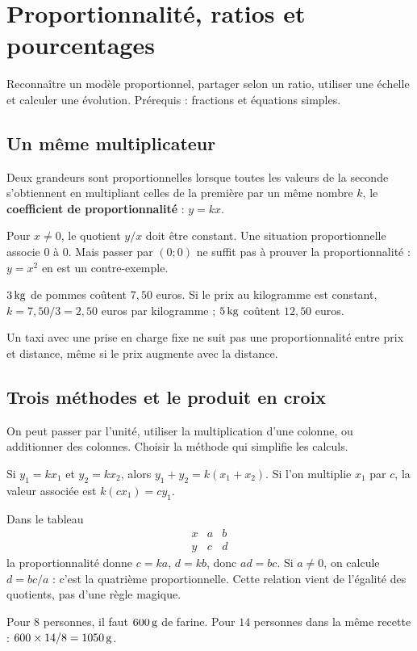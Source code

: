 \documentclass[../cours_3e.tex]{subfiles}
\begin{document}
\setcounter{chapter}{6}
\chapter{Proportionnalité, ratios et pourcentages}
\label{ch:proportionnalite}
\begin{objectif}
Reconnaître un modèle proportionnel, partager selon un ratio, utiliser une échelle et calculer une évolution. Prérequis : fractions et équations simples.
\end{objectif}
\section{Un même multiplicateur}
\begin{definition}
Deux grandeurs sont proportionnelles lorsque toutes les valeurs de la seconde s'obtiennent en multipliant celles de la première par un même nombre $k$, le \textbf{coefficient de proportionnalité} : $y=kx$.
\end{definition}
Pour $x\ne0$, le quotient $y/x$ doit être constant. Une situation proportionnelle associe $0$ à $0$. Mais passer par $(0;0)$ ne suffit pas à prouver la proportionnalité : $y=x^2$ en est un contre-exemple.
\begin{exemple}
$3\,\mathrm{kg}$ de pommes coûtent $7{,}50$ euros. Si le prix au kilogramme est constant, $k=7{,}50/3=2{,}50$ euros par kilogramme ; $5\,\mathrm{kg}$ coûtent $12{,}50$ euros.
\end{exemple}
Un taxi avec une prise en charge fixe ne suit pas une proportionnalité entre prix et distance, même si le prix augmente avec la distance.
\section{Trois méthodes et le produit en croix}
\begin{methode}
On peut passer par l'unité, utiliser la multiplication d'une colonne, ou additionner des colonnes. Choisir la méthode qui simplifie les calculs.
\end{methode}
\begin{justification}
Si $y_1=kx_1$ et $y_2=kx_2$, alors $y_1+y_2=k(x_1+x_2)$. Si l'on multiplie $x_1$ par $c$, la valeur associée est $k(cx_1)=cy_1$.
\end{justification}
Dans le tableau
\[
\begin{array}{c|cc}x&a&b\\\hline y&c&d\end{array}
\]
la proportionnalité donne $c=ka$, $d=kb$, donc $ad=bc$. Si $a\ne0$, on calcule $d=bc/a$ : c'est la quatrième proportionnelle. Cette relation vient de l'égalité des quotients, pas d'une règle magique.
\begin{exemple}
Pour $8$ personnes, il faut $600\,\mathrm{g}$ de farine. Pour $14$ personnes dans la même recette : $600\times14/8=1050\,\mathrm{g}$.
\end{exemple}
\end{document}
